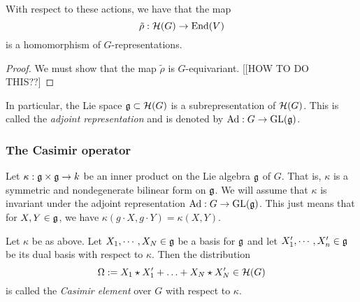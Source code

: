 \documentclass[11pt, english]{article}
\begin{document}
\begin{lemma}
\label{homog}
With respect to these actions, we have that the map
$$
\tilde \rho : \mathcal{H}(G) \to \operatorname{End}(V)
$$
is a homomorphism of $G$-representations.
\end{lemma}
\begin{proof}
We must show that the map $\tilde \rho$ is $G$-equivariant. [[HOW TO DO THIS??]
\end{proof}

In particular, the Lie space $\mathfrak g \subset \mathcal{H}(G)$ is a subrepresentation of $\mathcal{H}(G)$. This is called the \emph{adjoint representation} and is denoted by $\mathrm{Ad}:G \to \operatorname{GL}(\mathfrak g)$.


\subsubsection{The Casimir operator}

Let $\kappa: \mathfrak g \times \mathfrak g \to k$ be an inner product on the Lie algebra $\mathfrak g$ of $G$. That is, $\kappa$ is a symmetric and nondegenerate bilinear form on $\mathfrak g$. We will assume that $\kappa$ is invariant under the adjoint representation $\mathrm{Ad}: G \to \operatorname{GL}(\mathfrak g)$. This just means that for $X,Y \in \mathfrak g$, we have $\kappa(g \cdot X,g \cdot Y)=\kappa(X,Y)$. 

\begin{defi}

Let $\kappa$ be as above. Let $X_1,\cdots,X_N \in \mathfrak g$ be a basis for $\mathfrak g$ and let $X_1',\cdots,X_n' \in \mathfrak g$ be its dual basis with respect to $\kappa$. Then the distribution
$$
\Omega := X_1 \star X_1' + \ldots + X_N \star X_N' \in \mathcal{H}(G)
$$
is called the \emph{Casimir element} over $G$ with respect to $\kappa$.
\end{defi}
\end{document}
